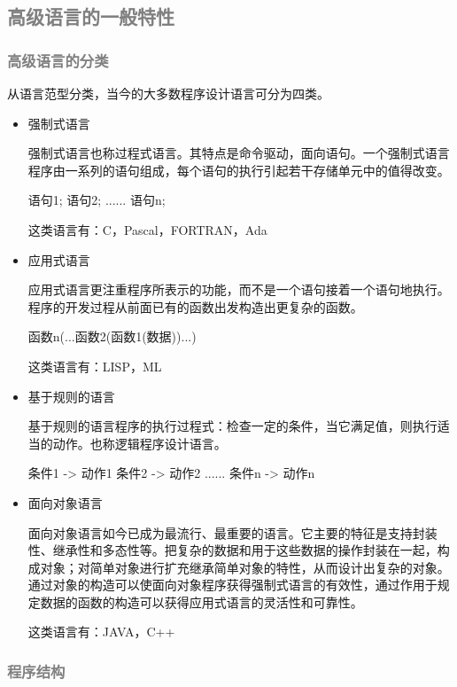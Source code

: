 \subsection{\textcolor{grey}{高级语言的一般特性}}
\subsubsection{\textcolor{grey}{高级语言的分类}}

从语言范型分类，当今的大多数程序设计语言可分为四类。
\begin{itemize}
\item 强制式语言

强制式语言也称过程式语言。其特点是命令驱动，面向语句。一个强制式语言程序由一系列的语句组成，每个语句的执行引起若干存储单元中的值得改变。

\begin{C++}
语句1;
语句2;
......
语句n;
\end{C++}

这类语言有：C，Pascal，FORTRAN，Ada

\item 应用式语言

应用式语言更注重程序所表示的功能，而不是一个语句接着一个语句地执行。程序的开发过程从前面已有的函数出发构造出更复杂的函数。

\begin{C++}
函数n(...函数2(函数1(数据))...)
\end{C++}

这类语言有：LISP，ML
\item 基于规则的语言

基于规则的语言程序的执行过程式：检查一定的条件，当它满足值，则执行适当的动作。也称逻辑程序设计语言。

\begin{C++}
条件1 -> 动作1
条件2 -> 动作2
......
条件n -> 动作n
\end{C++}

\item 面向对象语言

面向对象语言如今已成为最流行、最重要的语言。它主要的特征是支持封装性、继承性和多态性等。把复杂的数据和用于这些数据的操作封装在一起，构成对象；对简单对象进行扩充继承简单对象的特性，从而设计出复杂的对象。通过对象的构造可以使面向对象程序获得强制式语言的有效性，通过作用于规定数据的函数的构造可以获得应用式语言的灵活性和可靠性。

这类语言有：JAVA，C++
\end{itemize}

\subsubsection{\textcolor{grey}{程序结构}}

